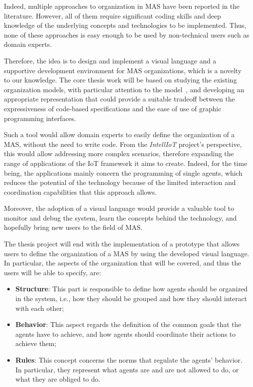Indeed, multiple approaches to organization in MAS have been reported in the literature.
However, all of them require significant coding skills and deep knowledge of the underlying concepts and technologies to be implemented.
Thus, none of these approaches is easy enough to be used by non-technical users such as domain experts.

Therefore, the idea is to design and implement a visual language and a supportive development environment for MAS organizations, which is a novelty to our knowledge.
The core thesis work will be based on studying the existing organization models, with particular attention to the \moiseplus{} model~\cite{10.1145/544741.544858}, and developing an appropriate representation that could provide a suitable tradeoff between the expressiveness of code-based specifications and the ease of use of graphic programming interfaces.

Such a tool would allow domain experts to easily define the organization of a MAS, without the need to write code.
From the \textit{IntellIoT} project's perspective, this would allow addressing more complex scenarios, therefore expanding the range of applications of the IoT framework it aims to create.
Indeed, for the time being, the applications mainly concern the programming of single agents, which reduces the potential of the technology because of the limited interaction and coordination capabilities that this approach allows.

Moreover, the adoption of a visual language would provide a valuable tool to monitor and debug the system, learn the concepts behind the technology, and hopefully bring new users to the field of MAS.

The thesis project will end with the implementation of a prototype that allows users to define the organization of a MAS by using the developed visual language.
In particular, the aspects of the organization that will be covered, and thus the users will be able to specify, are:
\begin{itemize}
    \item \textbf{Structure}: This part is responsible to define how agents should be organized in the system, i.e., how they should be grouped and how they should interact with each other;
    \item \textbf{Behavior}: This aspect regards the definition of the common goals that the agents have to achieve, and how agents should coordinate their actions to achieve them;
    \item \textbf{Rules}: This concept concerns the norms that regulate the agents' behavior.
    In particular, they represent what agents are and are not allowed to do, or what they are obliged to do.
\end{itemize}


